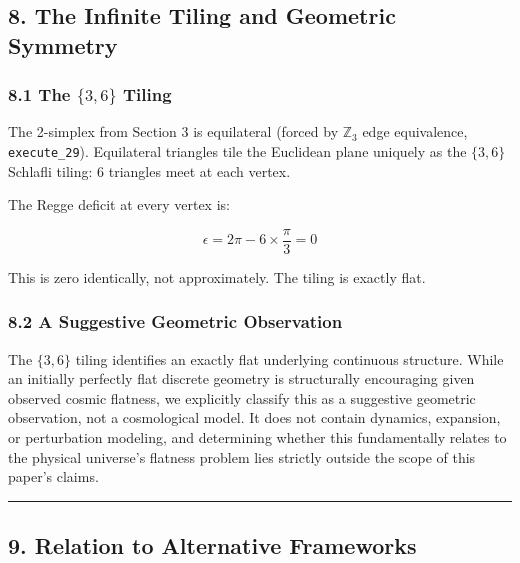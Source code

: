 \documentclass[
]{article}
\begin{document}
\hypertarget{the-infinite-tiling-and-geometric-symmetry}{%
\subsection{8. The Infinite Tiling and Geometric
Symmetry}\label{the-infinite-tiling-and-geometric-symmetry}}

\hypertarget{the-36-tiling}{%
\subsubsection{\texorpdfstring{8.1 The \(\{3,6\}\)
Tiling}{8.1 The \textbackslash\{3,6\textbackslash\} Tiling}}\label{the-36-tiling}}

The 2-simplex from Section 3 is equilateral (forced by \(\mathbb{Z}_3\)
edge equivalence, \texttt{execute\_29}). Equilateral triangles tile the
Euclidean plane uniquely as the \(\{3,6\}\) Schlafli tiling: 6 triangles
meet at each vertex.

The Regge deficit at every vertex is:

\[\epsilon = 2\pi - 6 \times \frac{\pi}{3} = 0\]

This is zero identically, not approximately. The tiling is exactly flat.

\hypertarget{a-suggestive-geometric-observation}{%
\subsubsection{8.2 A Suggestive Geometric
Observation}\label{a-suggestive-geometric-observation}}

The \(\{3,6\}\) tiling identifies an exactly flat underlying continuous
structure. While an initially perfectly flat discrete geometry is
structurally encouraging given observed cosmic flatness, we explicitly
classify this as a suggestive geometric observation, not a cosmological
model. It does not contain dynamics, expansion, or perturbation
modeling, and determining whether this fundamentally relates to the
physical universe's flatness problem lies strictly outside the scope of
this paper's claims.

\begin{center}\rule{0.5\linewidth}{0.5pt}\end{center}

\hypertarget{relation-to-alternative-frameworks}{%
\subsection{9. Relation to Alternative
Frameworks}\label{relation-to-alternative-frameworks}}
\end{document}
